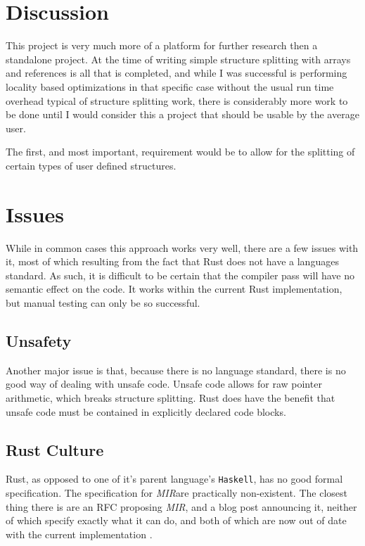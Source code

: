 \documentclass[12pt,final]{article}
\newcommand{\mirname}{{\small \em MIR}}
\def\mir{\mirname}
\begin{document}
\section{Discussion}
\label{sec:discuss}

This project is very much more of a platform for further research then a
standalone project. At the time of writing simple structure splitting
with arrays and references is all that is completed, and 
while I was successful is performing locality based
optimizations in that specific case without the usual run time overhead typical of structure splitting
work, there is considerably more work to be done until I would consider this
a project that should be usable by the average user.

The first, and most important, requirement would be to allow for the splitting
of certain types of user defined structures.

\section{Issues}

While in common cases this approach works very well, there are a few issues with
it, most of which resulting from the fact that Rust does not have a languages
standard. As such, it is difficult to be certain that the compiler pass will
have no semantic effect on the code. It works within the current Rust
implementation, but manual testing can only be so successful.

\subsection{Unsafety}
\label{sec:unsafe}


Another major issue is that, because there is no language standard, there is no
good way of dealing with unsafe code. Unsafe code allows for raw pointer
arithmetic, which breaks structure splitting. Rust does have the benefit that
unsafe code must be contained in explicitly declared code blocks.

\subsection{Rust Culture}
\label{sec:culture}

Rust, as opposed to one of it's parent language's \texttt{Haskell}, has no good
formal specification. The specification for \mir are practically non-existent. %
The closest thing there is are an RFC proposing \mir, and a blog post announcing
it, neither of which specify exactly what it can do, and both of which are now
out of date with the current implementation .
\end{document}
